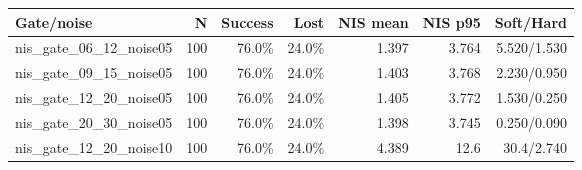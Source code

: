\begin{tabular}{lrrrrrr}
\toprule
\textbf{Gate/noise} & \textbf{N} & \textbf{Success} & \textbf{Lost} & \textbf{NIS mean} & \textbf{NIS p95} & \textbf{Soft/Hard} \\
\midrule
nis\_gate\_06\_12\_noise05 & 100 & 76.0\% & 24.0\% & 1.397 & 3.764 & 5.520/1.530 \\
nis\_gate\_09\_15\_noise05 & 100 & 76.0\% & 24.0\% & 1.403 & 3.768 & 2.230/0.950 \\
nis\_gate\_12\_20\_noise05 & 100 & 76.0\% & 24.0\% & 1.405 & 3.772 & 1.530/0.250 \\
nis\_gate\_20\_30\_noise05 & 100 & 76.0\% & 24.0\% & 1.398 & 3.745 & 0.250/0.090 \\
nis\_gate\_12\_20\_noise10 & 100 & 76.0\% & 24.0\% & 4.389 & 12.6 & 30.4/2.740 \\
\bottomrule
\end{tabular}

